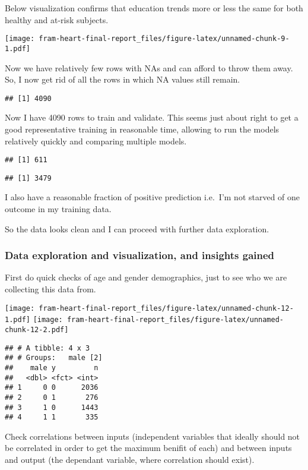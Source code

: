 \documentclass[]{article}
\begin{document}
Below visualization confirms that education trends more or less the same
for both healthy and at-risk subjects.

\texttt{[image: fram-heart-final-report\_files/figure-latex/unnamed-chunk-9-1.pdf]}

Now we have relatively few rows with NAs and can afford to throw them
away. So, I now get rid of all the rows in which NA values still remain.

\begin{verbatim}
## [1] 4090
\end{verbatim}

Now I have 4090 rows to train and validate. This seems just about right
to get a good representative training in reasonable time, allowing to
run the models relatively quickly and comparing multiple models.

\begin{verbatim}
## [1] 611
\end{verbatim}

\begin{verbatim}
## [1] 3479
\end{verbatim}

I also have a reasonable fraction of positive prediction i.e.~I'm not
starved of one outcome in my training data.

So the data looks clean and I can proceed with further data exploration.

\subsubsection{Data exploration and visualization, and insights
gained}\label{data-exploration-and-visualization-and-insights-gained}

First do quick checks of age and gender demographics, just to see who we
are collecting this data from.

\texttt{[image: fram-heart-final-report\_files/figure-latex/unnamed-chunk-12-1.pdf]}
\texttt{[image: fram-heart-final-report\_files/figure-latex/unnamed-chunk-12-2.pdf]}

\begin{verbatim}
## # A tibble: 4 x 3
## # Groups:   male [2]
##    male y         n
##   <dbl> <fct> <int>
## 1     0 0      2036
## 2     0 1       276
## 3     1 0      1443
## 4     1 1       335
\end{verbatim}

Check correlations between inputs (independent variables that ideally
should not be correlated in order to get the maximum benifit of each)
and between inputs and output (the dependant variable, where correlation
should exist).
\end{document}
